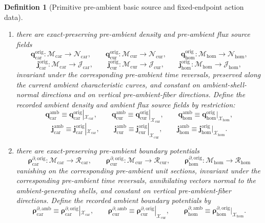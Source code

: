 \documentclass[11pt]{article}
\newcommand{\TensorDensityClass}{\mathscr N_{\mathrm{car}}}
\newcommand{\CurDensityClass}{\mathscr N_{\mathrm{cur}}}
\newcommand{\HomDensityClass}{\mathscr N_{\mathrm{hom}}}
\newcommand{\TensorFluxClass}{\mathscr J_{\mathrm{car}}}
\newcommand{\CurFluxClass}{\mathscr J_{\mathrm{cur}}}
\newcommand{\HomFluxClass}{\mathscr J_{\mathrm{hom}}}
\newcommand{\TensorPhaseReadClass}{\mathscr R_{\mathrm{car}}}
\newcommand{\CurPhaseReadClass}{\mathscr R_{\mathrm{cur}}}
\newcommand{\HomPhaseReadClass}{\mathscr R_{\mathrm{hom}}}
\newcommand{\TensorAmbientSpace}{\mathcal X_{\mathrm{car}}}
\newcommand{\CurAmbientSpace}{\mathcal X_{\mathrm{cur}}}
\newcommand{\HomAmbientSpace}{\mathcal X_{\mathrm{hom}}}
\newcommand{\TensorAmbientDensitySource}{\boldsymbol{q}_{\mathrm{car}}^{\mathrm{amb}}}
\newcommand{\CurAmbientDensitySource}{\boldsymbol{q}_{\mathrm{cur}}^{\mathrm{amb}}}
\newcommand{\HomAmbientDensitySource}{\boldsymbol{q}_{\mathrm{hom}}^{\mathrm{amb}}}
\newcommand{\TensorAmbientFluxSource}{\boldsymbol{j}_{\mathrm{car}}^{\mathrm{amb}}}
\newcommand{\CurAmbientFluxSource}{\boldsymbol{j}_{\mathrm{cur}}^{\mathrm{amb}}}
\newcommand{\HomAmbientFluxSource}{\boldsymbol{j}_{\mathrm{hom}}^{\mathrm{amb}}}
\newcommand{\TensorAmbientBoundarySource}{\boldsymbol{\rho}_{\mathrm{car}}^{\partial,\mathrm{amb}}}
\newcommand{\CurAmbientBoundarySource}{\boldsymbol{\rho}_{\mathrm{cur}}^{\partial,\mathrm{amb}}}
\newcommand{\HomAmbientBoundarySource}{\boldsymbol{\rho}_{\mathrm{hom}}^{\partial,\mathrm{amb}}}
\newcommand{\TensorOriginSpace}{\mathcal M_{\mathrm{car}}}
\newcommand{\CurOriginSpace}{\mathcal M_{\mathrm{cur}}}
\newcommand{\HomOriginSpace}{\mathcal M_{\mathrm{hom}}}
\newcommand{\TensorOriginDensitySource}{\boldsymbol{q}_{\mathrm{car}}^{\mathrm{orig}}}
\newcommand{\CurOriginDensitySource}{\boldsymbol{q}_{\mathrm{cur}}^{\mathrm{orig}}}
\newcommand{\HomOriginDensitySource}{\boldsymbol{q}_{\mathrm{hom}}^{\mathrm{orig}}}
\newcommand{\TensorOriginFluxSource}{\boldsymbol{j}_{\mathrm{car}}^{\mathrm{orig}}}
\newcommand{\CurOriginFluxSource}{\boldsymbol{j}_{\mathrm{cur}}^{\mathrm{orig}}}
\newcommand{\HomOriginFluxSource}{\boldsymbol{j}_{\mathrm{hom}}^{\mathrm{orig}}}
\newcommand{\TensorOriginBoundarySource}{\boldsymbol{\rho}_{\mathrm{car}}^{\partial,\mathrm{orig}}}
\newcommand{\CurOriginBoundarySource}{\boldsymbol{\rho}_{\mathrm{cur}}^{\partial,\mathrm{orig}}}
\newcommand{\HomOriginBoundarySource}{\boldsymbol{\rho}_{\mathrm{hom}}^{\partial,\mathrm{orig}}}
\newtheorem{definition}{Definition}
\begin{document}
\begin{definition}[Primitive pre-ambient basic source and fixed-endpoint action data]
\begin{enumerate}
    \item there are exact-preserving pre-ambient density and pre-ambient flux source fields
    \[
    \TensorOriginDensitySource:\TensorOriginSpace\to\TensorDensityClass,\qquad
    \CurOriginDensitySource:\CurOriginSpace\to\CurDensityClass,\qquad
    \HomOriginDensitySource:\HomOriginSpace\to\HomDensityClass,
    \]
    \[
    \TensorOriginFluxSource:\TensorOriginSpace\to\TensorFluxClass,\qquad
    \CurOriginFluxSource:\CurOriginSpace\to\CurFluxClass,\qquad
    \HomOriginFluxSource:\HomOriginSpace\to\HomFluxClass,
    \]
    invariant under the corresponding pre-ambient time reversals, preserved along the current ambient characteristic curves, and constant on ambient-shell-normal directions and on vertical pre-ambient-fiber directions. Define the recorded ambient density and ambient flux source fields by restriction:
    \begin{equation}
    \TensorAmbientDensitySource\equiv\TensorOriginDensitySource|_{\TensorAmbientSpace},\qquad
    \CurAmbientDensitySource\equiv\CurOriginDensitySource|_{\CurAmbientSpace},\qquad
    \HomAmbientDensitySource\equiv\HomOriginDensitySource|_{\HomAmbientSpace},
    \label{eq:ambient_density_from_origin}
    \end{equation}
    \begin{equation}
    \TensorAmbientFluxSource\equiv\TensorOriginFluxSource|_{\TensorAmbientSpace},\qquad
    \CurAmbientFluxSource\equiv\CurOriginFluxSource|_{\CurAmbientSpace},\qquad
    \HomAmbientFluxSource\equiv\HomOriginFluxSource|_{\HomAmbientSpace}.
    \label{eq:ambient_flux_from_origin}
    \end{equation}
    \item there are exact-preserving pre-ambient boundary potentials
    \[
    \TensorOriginBoundarySource:\TensorOriginSpace\to\TensorPhaseReadClass,\qquad
    \CurOriginBoundarySource:\CurOriginSpace\to\CurPhaseReadClass,\qquad
    \HomOriginBoundarySource:\HomOriginSpace\to\HomPhaseReadClass
    \]
    vanishing on the corresponding pre-ambient unit sections, invariant under the corresponding pre-ambient time reversals, annihilating vectors normal to the ambient-generating shells, and constant on vertical pre-ambient-fiber directions. Define the recorded ambient boundary potentials by
    \begin{equation}
    \TensorAmbientBoundarySource\equiv\TensorOriginBoundarySource|_{\TensorAmbientSpace},\qquad
    \CurAmbientBoundarySource\equiv\CurOriginBoundarySource|_{\CurAmbientSpace},\qquad
    \HomAmbientBoundarySource\equiv\HomOriginBoundarySource|_{\HomAmbientSpace}.

\end{equation}
\end{enumerate}
\end{definition}
\end{document}
